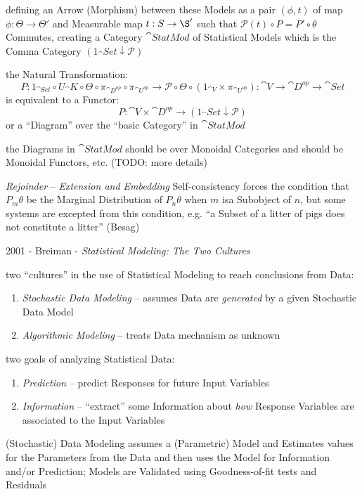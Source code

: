 defining an Arrow (Morphism) between these Models as a pair $(\phi, t)$ of map
$\phi : \Theta \to \Theta'$ and Measurable map $t : S \to \S'$ such that
$\mathcal{P}(t) \circ P = P' \circ \theta$ Commutes, creating a Category
$\cat{StatMod}$ of Statistical Models which is the Comma Category
$(1_\cat{Set} \downarrow \mathcal{P})$

the Natural Transformation:
\[
  P : 1_{\cat{Set}} \circ U_\cat{K} \circ \Theta \circ \pi_{\cat{D}^{op}}
      \circ \pi_{\cat{U}^{op}}
    \to \mathcal{P} \circ \Theta \circ (1_{\cat{V}} \times \pi_{\cat{U}^{op}})
    : \cat{V} \to \cat{D}^{op} \to \cat{Set}
\]
is equivalent to a Functor:
\[
  P : \cat{V} \times \cat{D}^{op} \to (1_\cat{Set} \downarrow \mathcal{P})
\]
or a ``Diagram'' over the ``basic Category'' in $\cat{StatMod}$

the Diagrams in $\cat{StatMod}$ should be over Monoidal Categories and should be
Monoidal Functors, etc. (TODO: more details)

\emph{Rejoinder} -- \emph{Extension and Embedding} Self-consistency forces the
condition that $P_m\theta$ be the Marginal Distribution of $P_n\theta$ when $m$
isa  Subobject of $n$, but some systems are excepted from this condition, e.g.
``a Subset of a litter of pigs does not constitute a litter'' (Besag)

\asterism

2001 - Breiman - \emph{Statistical Modeling: The Two Cultures}

two ``cultures'' in the use of Statistical Modeling to reach conclusions from
Data:
\begin{enumerate}
  \item \emph{Stochastic Data Modeling} -- assumes Data are \emph{generated} by
    a given Stochastic Data Model
  \item \emph{Algorithmic Modeling} -- treats Data mechanism as unknown
\end{enumerate}

two goals of analyzing Statistical Data:
\begin{enumerate}
  \item \emph{Prediction} -- predict Responses for future Input Variables
  \item \emph{Information} -- ``extract'' some Information about \emph{how}
    Response Variables are associated to the Input Variables
\end{enumerate}

(Stochastic) Data Modeling assumes a (Parametric) Model and Estimates values for
the Parameters from the Data and then uses the Model for Information and/or
Prediction; Models are Validated using Goodness-of-fit tests and Residuals

